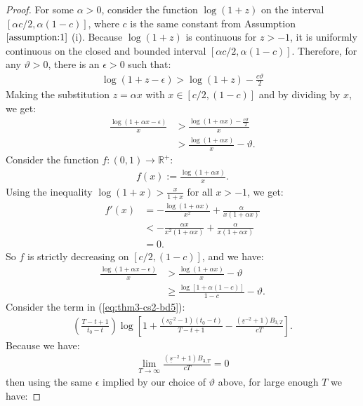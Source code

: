 \begin{proof}
For some $\alpha > 0$, consider the function $\log(1 + z)$ on the interval $[\alpha c/2, \alpha (1-c)]$, where $c$ is the same constant from Assumption $\ref{assumption:1}$ (i). Because $\log(1 + z)$ is continuous for $z > -1$, it is uniformly continuous on the closed and bounded interval $[\alpha c/2, \alpha (1-c)]$. Therefore, for any $\vartheta > 0$, there is an $\epsilon > 0$ such that:
\begin{align*}
     \log(1 + z - \epsilon) > \log(1 + z) - \frac{c \vartheta}{2}
\end{align*}
Making the substitution $z = \alpha x$ with $x \in [c/2, (1-c)]$ and by dividing by $x$, we get:
\begin{align*}
     \frac{\log(1 + \alpha x - \epsilon)}{x} &> \frac{\log(1 + \alpha x) - \frac{c \vartheta}{2}}{x} \\
     &> \frac{\log(1 + \alpha x)}{x} - \vartheta. \tag{$x \geq c/2$}
\end{align*}
Consider the function $f: (0,1) \to \mathbb{R}^+$:
\begin{align*}
    f(x) := \frac{\log(1 + \alpha x)}{x}.
\end{align*}
Using the inequality $\log(1+x) > \frac{x}{1+x}$ for all $x > - 1$, we get:
\begin{align*}
    f'(x) &= -\frac{\log(1 + \alpha x)}{x^2} + \frac{\alpha}{x(1 + \alpha x)} \\
    &< -\frac{\alpha x }{x^2(1+\alpha x)} + \frac{\alpha}{x(1 + \alpha x)} \\
    &= 0.
\end{align*}
So $f$ is strictly decreasing on $[c/2, (1-c)]$, and we have:
\begin{align*}
     \frac{\log(1 + \alpha x - \epsilon)}{x} &> \frac{\log(1 + \alpha x)}{x} - \vartheta \\
     &\geq \frac{\log[1 + \alpha (1-c)]}{1-c} - \vartheta.
\end{align*}
Consider the term in (\ref{eq:thm3-cs2-bd5}): 
\begin{align*}
     \left(\frac{T - t +1}{t_0-t}\right)\log\left[1 + \frac{\left(s_0^{-2} -1\right)(t_0 - t)}{T - t + 1} - \frac{\left(\underline{s}^{-2} + 1\right) B_{3,T}}{cT} \right].
\end{align*}
Because we have:
\begin{align*}
    \lim_{T \to \infty}  \frac{\left(\underline{s}^{-2} + 1\right) B_{3,T}}{cT} = 0
\end{align*}
then using the same $\epsilon$ implied by our choice of $\vartheta$ above, for large enough $T$ we have:

\end{proof}
